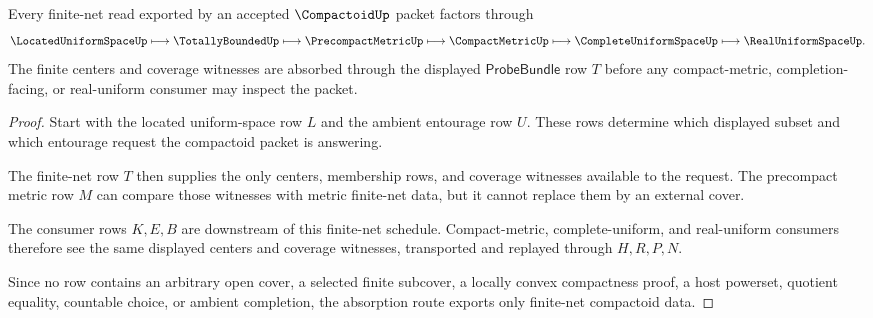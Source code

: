 \begin{theorem}
\label{thm:compactoid-finite-net-absorption}
Every finite-net read exported by an accepted $\CompactoidUp$ packet factors through
$$
\LocatedUniformSpaceUp \longmapsto \TotallyBoundedUp \longmapsto \PrecompactMetricUp \longmapsto \CompactMetricUp \longmapsto \CompleteUniformSpaceUp \longmapsto \RealUniformSpaceUp .
$$
The finite centers and coverage witnesses are absorbed through the displayed $\mathsf{ProbeBundle}$ row $T$ before any compact-metric, completion-facing, or real-uniform consumer may inspect the packet.
\end{theorem}
\begin{proof}
Start with the located uniform-space row $L$ and the ambient entourage row $U$. These rows determine which displayed subset and which entourage request the compactoid packet is answering.

The finite-net row $T$ then supplies the only centers, membership rows, and coverage witnesses available to the request. The precompact metric row $M$ can compare those witnesses with metric finite-net data, but it cannot replace them by an external cover.

The consumer rows $K,E,B$ are downstream of this finite-net schedule. Compact-metric, complete-uniform, and real-uniform consumers therefore see the same displayed centers and coverage witnesses, transported and replayed through $H,R,P,N$.

Since no row contains an arbitrary open cover, a selected finite subcover, a locally convex compactness proof, a host powerset, quotient equality, countable choice, or ambient completion, the absorption route exports only finite-net compactoid data.
\end{proof}


